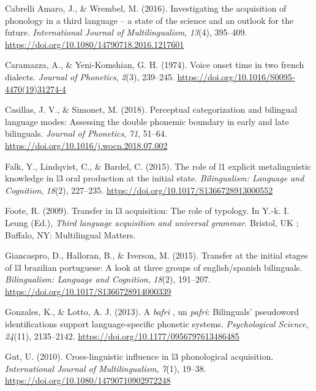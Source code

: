 \documentclass[
  english,
  man]{apa6}
\begin{document}
\leavevmode\hypertarget{ref-cabrelli_amaro_investigating_2016}{}%
Cabrelli Amaro, J., \& Wrembel, M. (2016). Investigating the acquisition of phonology in a third language -- a state of the science and an outlook for the future. \emph{International Journal of Multilingualism}, \emph{13}(4), 395--409. \url{https://doi.org/10.1080/14790718.2016.1217601}

\leavevmode\hypertarget{ref-caramazza_voice_1974}{}%
Caramazza, A., \& Yeni-Komshian, G. H. (1974). Voice onset time in two french dialects. \emph{Journal of Phonetics}, \emph{2}(3), 239--245. \url{https://doi.org/10.1016/S0095-4470(19)31274-4}

\leavevmode\hypertarget{ref-casillas_perceptual_2018}{}%
Casillas, J. V., \& Simonet, M. (2018). Perceptual categorization and bilingual language modes: Assessing the double phonemic boundary in early and late bilinguals. \emph{Journal of Phonetics}, \emph{71}, 51--64. \url{https://doi.org/10.1016/j.wocn.2018.07.002}

\leavevmode\hypertarget{ref-falk_role_2015}{}%
Falk, Y., Lindqvist, C., \& Bardel, C. (2015). The role of l1 explicit metalinguistic knowledge in l3 oral production at the initial state. \emph{Bilingualism: Language and Cognition}, \emph{18}(2), 227--235. \url{https://doi.org/10.1017/S1366728913000552}

\leavevmode\hypertarget{ref-foote_transfer_2009}{}%
Foote, R. (2009). Transfer in l3 acquisition: The role of typology. In Y.-k. I. Leung (Ed.), \emph{Third language acquisition and universal grammar}. Bristol, UK ; Buffalo, NY: Multilingual Matters.

\leavevmode\hypertarget{ref-giancaspro_transfer_2015}{}%
Giancaspro, D., Halloran, B., \& Iverson, M. (2015). Transfer at the initial stages of l3 brazilian portuguese: A look at three groups of english/spanish bilinguals. \emph{Bilingualism: Language and Cognition}, \emph{18}(2), 191--207. \url{https://doi.org/10.1017/S1366728914000339}

\leavevmode\hypertarget{ref-gonzales_bafri_2013}{}%
Gonzales, K., \& Lotto, A. J. (2013). A \emph{bafri} , un \emph{pafri}: Bilinguals' pseudoword identifications support language-specific phonetic systems. \emph{Psychological Science}, \emph{24}(11), 2135--2142. \url{https://doi.org/10.1177/0956797613486485}

\leavevmode\hypertarget{ref-gut_cross-linguistic_2010}{}%
Gut, U. (2010). Cross-linguistic influence in l3 phonological acquisition. \emph{International Journal of Multilingualism}, \emph{7}(1), 19--38. \url{https://doi.org/10.1080/14790710902972248}
\end{document}
